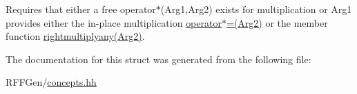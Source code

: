 Requires that either a free operator$\ast$(\-Arg1,\-Arg2) exists for multiplication or Arg1 provides either the in-\/place multiplication \hyperlink{structRFFGen_1_1Concepts_1_1MultiplicationConcept_a65cf060bcfd7bd39b527de6c87056539}{operator$\ast$=(\-Arg2)} or the member function \hyperlink{structRFFGen_1_1Concepts_1_1MultiplicationConcept_ae876451286ab0e902a5cec841ad01f2e}{rightmultiplyany(\-Arg2)}. 

The documentation for this struct was generated from the following file\-:\begin{DoxyCompactItemize}
\item 
R\-F\-F\-Gen/\hyperlink{concepts_8hh}{concepts.\-hh}\end{DoxyCompactItemize}
